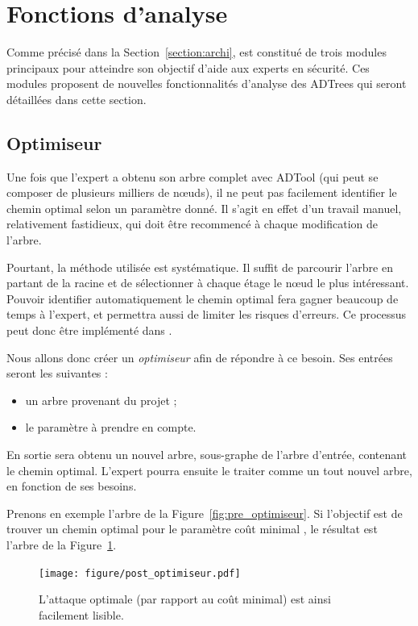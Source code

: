 \section{Fonctions d'analyse}
    Comme précisé dans la {\sc Section}~\ref{section:archi}, \glasir{} est constitué de trois modules principaux pour atteindre son objectif d'aide aux experts en sécurité. Ces modules proposent de nouvelles fonctionnalités d'analyse des ADTrees qui seront détaillées dans cette section. 

    \subsection{Optimiseur}
        \label{subsection:optimiseur}

        Une fois que l'expert a obtenu son arbre complet avec ADTool (qui peut se composer de plusieurs milliers de nœuds), il ne peut pas facilement identifier le chemin optimal selon un paramètre donné. Il s'agit en effet d'un travail manuel, relativement fastidieux, qui doit être recommencé à chaque modification de l'arbre.
        
        Pourtant, la méthode utilisée est systématique. Il suffit de parcourir l'arbre en partant de la racine et de sélectionner à chaque étage le nœud le plus intéressant. Pouvoir identifier automatiquement le chemin optimal fera gagner beaucoup de temps à l'expert, et permettra aussi de limiter les risques d'erreurs. Ce processus peut donc être implémenté dans \glasir{}. 

        Nous allons donc créer un \textit{optimiseur} afin de répondre à ce besoin.
        Ses entrées seront les suivantes :
        \begin{itemize}
            \item un arbre provenant du projet ;
            \item le paramètre à prendre en compte.
        \end{itemize}
        En sortie sera obtenu un nouvel arbre, sous-graphe de l'arbre d'entrée, contenant le chemin optimal. L'expert pourra ensuite le traiter comme un tout nouvel arbre, en fonction de ses besoins.
        
        Prenons en exemple l'arbre de la {\sc Figure}~\ref{fig:pre_optimiseur}. Si l'objectif est de trouver un chemin optimal pour le paramètre \og coût minimal \fg{}, le résultat est l'arbre de la {\sc Figure}~\ref{fig:arbre_post_opti}.
        
        
        \begin{figure}[h!]
            \centering
            \texttt{[image: figure/post\_optimiseur.pdf]}
            \caption{L'attaque optimale (par rapport au coût minimal) est ainsi facilement lisible.}
            \label{fig:arbre_post_opti}
        \end{figure}

